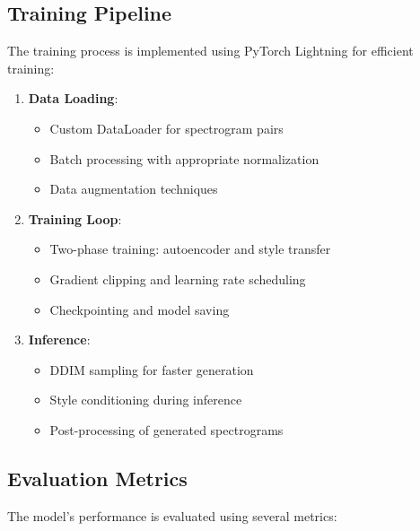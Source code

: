 \subsection{Training Pipeline}
The training process is implemented using PyTorch Lightning for efficient training:

\begin{enumerate}
    \item \textbf{Data Loading}:
    \begin{itemize}
        \item Custom DataLoader for spectrogram pairs
        \item Batch processing with appropriate normalization
        \item Data augmentation techniques
    \end{itemize}
    
    \item \textbf{Training Loop}:
    \begin{itemize}
        \item Two-phase training: autoencoder and style transfer
        \item Gradient clipping and learning rate scheduling
        \item Checkpointing and model saving
    \end{itemize}
    
    \item \textbf{Inference}:
    \begin{itemize}
        \item DDIM sampling for faster generation
        \item Style conditioning during inference
        \item Post-processing of generated spectrograms
    \end{itemize}
\end{enumerate}

\subsection{Evaluation Metrics}
The model's performance is evaluated using several metrics:

